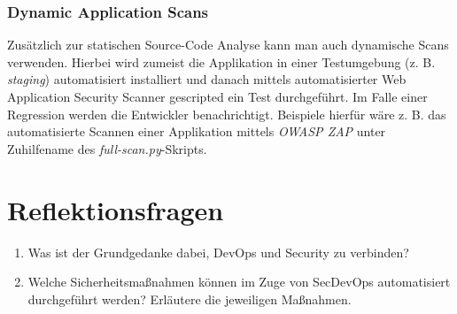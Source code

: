 \subsubsection{Dynamic Application Scans}

Zusätzlich zur statischen Source-Code Analyse kann man auch dynamische Scans verwenden. Hierbei wird zumeist die Applikation in einer Testumgebung (z. B. \textit{staging}) automatisiert installiert und danach mittels automatisierter Web Application Security Scanner gescripted ein Test durchgeführt. Im Falle einer Regression werden die Entwickler benachrichtigt. Beispiele hierfür wäre z. B. das automatisierte Scannen einer Applikation mittels \textit{OWASP ZAP} unter Zuhilfename des \textit{full-scan.py}-Skripts.

\section{Reflektionsfragen}

\begin{enumerate}
	\item Was ist der Grundgedanke dabei, DevOps und Security zu verbinden?
	\item Welche Sicherheitsmaßnahmen können im Zuge von SecDevOps automatisiert durchgeführt werden? Erläutere die jeweiligen Maßnahmen.
\end{enumerate}
